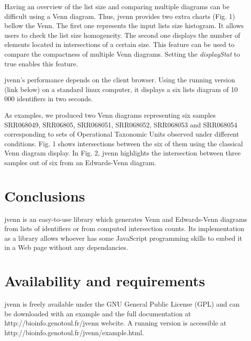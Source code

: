 \documentclass{bmcart}
\begin{document}
Having an overview of the list size and comparing multiple diagrams can be difficult using a Venn diagram. Thus, jvenn provides two extra charts (Fig. 1) 
bellow the Venn. The first one represents the input lists size histogram. It allows users to check the list size homogeneity. The second one displays 
the number of elements located in intersections of a certain size. This feature can be used to compare the compactness of multiple Venn diagrams. 
Setting the \textit{displayStat} to true enables this feature.

jvenn's performance depends on the client browser. Using the running version (link below) on a standard linux computer, it displays a six lists diagram of 
10 000 identifiers in two seconds.

As examples, we produced two Venn diagrams representing six samples SRR068049, SRR06805, SRR068051, SRR068052, SRR068053 and 
SRR068054 corresponding to sets of Operational Taxonomic Units observed under different conditions. Fig. 1 shows intersections
between the six of them using the classical Venn diagram display. In Fig. 2, jvenn highlights the intersection between three samples out of 
six from an Edwards-Venn diagram.


\section*{Conclusions}

jvenn is an easy-to-use library which generates Venn and Edwards-Venn diagrams from lists of identifiers or from computed intersection 
counts. Its implementation as a library allows whoever has some JavaScript programming skills to embed it in a Web page without any 
dependancies.

\section*{Availability and requirements}

jvenn is freely available under the GNU General Public License (GPL) and can be downloaded with an example and the full documentation
at http://bioinfo.genotoul.fr/jvenn  webcite. A running version is accessible at http://bioinfo.genotoul.fr/jvenn/example.html.

\end{document}
